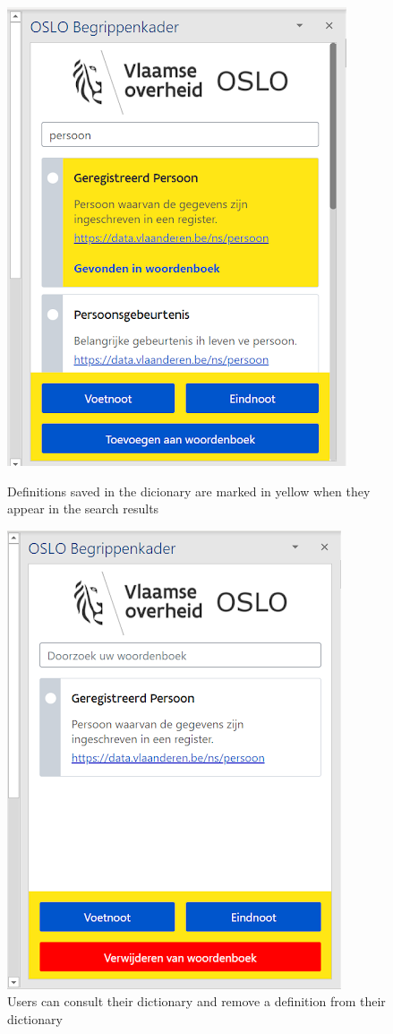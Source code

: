 \documentclass[manuscript]{acmart}
\begin{document}
\begin{figure}
\centering
\begin{minipage}{.5\textwidth}
  \centering
  \includegraphics[scale=.5]{images/oslo-dictionary-1}
  \caption{Definitions saved in the dicionary are marked in yellow when they appear in the search results}
  \label{oslo-dictionary-1}
\end{minipage}%
\begin{minipage}{.45\textwidth}
  \centering
  \includegraphics[scale=.5]{images/oslo-dictionary-2}
  \caption{Users can consult their dictionary and remove a definition from their dictionary}
  \label{oslo-dictionary-2}
\end{minipage}
\end{figure}
\end{document}
